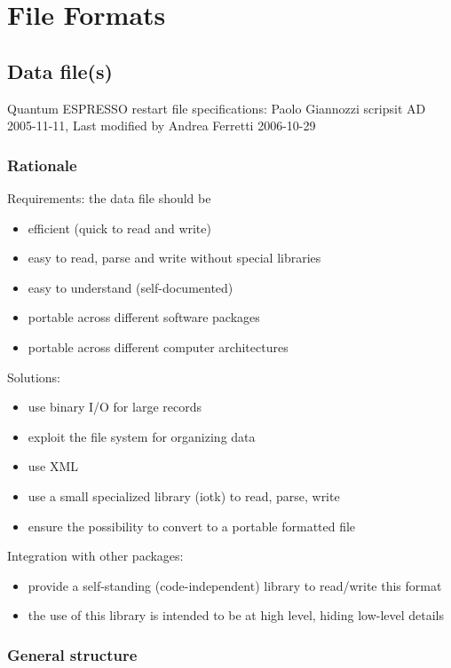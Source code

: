 \documentclass[12pt,a4paper]{article}
\begin{document}
\section{ File Formats}
\subsection{Data file(s)}

Quantum ESPRESSO restart file specifications:
Paolo Giannozzi scripsit AD 2005-11-11,
Last modified by Andrea Ferretti 2006-10-29

\subsubsection{Rationale}

Requirements: the data file should be
\begin{itemize}
\item efficient (quick to read and write)
\item easy to read, parse and write without special libraries
\item easy to understand (self-documented)
\item portable across different software packages
\item portable across different computer architectures 
\end{itemize}
Solutions:
\begin{itemize}
\item use binary I/O for large records
\item exploit the file system for organizing data
\item use XML
\item use a small specialized library (iotk) to read, parse, write 
\item ensure the possibility to convert to a portable formatted file
\end{itemize}
Integration with other packages:
\begin{itemize}
\item provide a self-standing (code-independent) library to read/write this format
\item the use of this library is intended to be at high level, hiding low-level details
\end{itemize}

\subsubsection{General structure}
\end{document}
